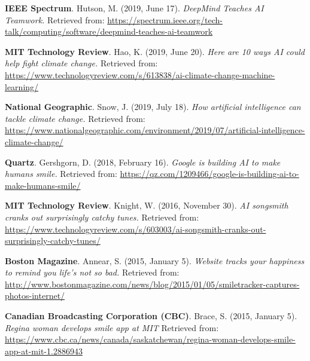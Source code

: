 \documentclass[paper=letter,fontsize=11pt]{scrartcl} %
\newcommand{\PressEntry}[5]{
		\noindent \textbf{#5}. #1 (#2). \textit{#3} Retrieved from: \url{#4}}
\begin{document}
\begin{etaremune}
\item\PressEntry{Hutson, M.}{2019, June 17}{DeepMind Teaches AI Teamwork.}{https://spectrum.ieee.org/tech-talk/computing/software/deepmind-teaches-ai-teamwork}{IEEE Spectrum}

\item\PressEntry{Hao, K.}{2019, June 20}{Here are 10 ways AI could help fight climate change.}{https://www.technologyreview.com/s/613838/ai-climate-change-machine-learning/}{MIT Technology Review}

\item\PressEntry{Snow, J.}{2019, July 18}{How artificial intelligence can tackle climate change.}{https://www.nationalgeographic.com/environment/2019/07/artificial-intelligence-climate-change/}{National Geographic}

\item\PressEntry{Gershgorn, D.}{2018, February 16}{Google is building AI to make humans smile.}{https://qz.com/1209466/google-is-building-ai-to-make-humans-smile/}{Quartz}

\item\PressEntry{Knight, W.}{2016, November 30}{AI songsmith cranks out surprisingly catchy tunes.}{https://www.technologyreview.com/s/603003/ai-songsmith-cranks-out-surprisingly-catchy-tunes/}{MIT Technology Review}

\item\PressEntry{Annear, S.}{2015, January 5}{Website tracks your happiness to remind you life’s not so bad.}{http://www.bostonmagazine.com/news/blog/2015/01/05/smiletracker-captures-photos-internet/}{Boston Magazine}

\item\PressEntry{Brace, S.}{2015, January 5}{Regina woman develops smile app at MIT}
{https://www.cbc.ca/news/canada/saskatchewan/regina-woman-develops-smile-app-at-mit-1.2886943}{Canadian Broadcasting Corporation (CBC)}

\end{etaremune}


\end{document}
